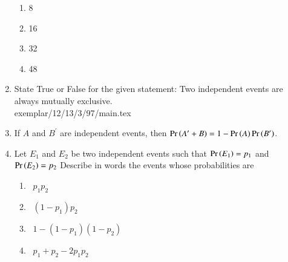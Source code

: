 \begin{enumerate}[label=\thesubsection.\arabic*,ref=\thesubsection.\theenumi,resume*]
\begin{table}[htb]
\caption{}
\label{tab:exemplar/12/13/3/87}
\end{table}
\begin{enumerate}
\item 8
\item 16
\item 32
\item 48
\end{enumerate}
\solution

\item State True or False for the given statement:
Two independent events are always mutually exclusive.\\
\solution 
 {exemplar/12/13/3/97/main.tex}
\item If $A$ and $B^\prime$ are independent events, then $\Pr\left(A^\prime+B\right)=1-\Pr\left(A\right)\Pr\left(B^\prime\right)$.\\
\solution

\item Let $E_1$ and $E_2$ be two independent events such that $\Pr\left(E_1\right) = p_1 $ and $ \Pr\left(E_2\right) = p_2 $  Describe in words the events whose probabilities are
\begin{enumerate}
\item \ $p_1 p_2$
\quad\item \ $(1 - p_1) p_2 $
\quad\item \ $1 - (1 - p_1)(1 - p_2)$
\quad\item \ $p_1 + p_2 - 2p_1 p_2$
\end{enumerate}
\solution

\end{enumerate}
